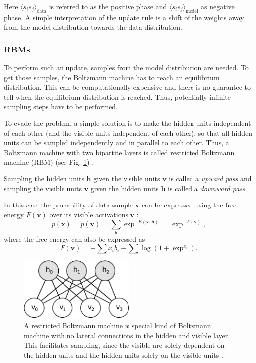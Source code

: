 Here $\langle s_i s_j \rangle_{\text{data}}$ is referred to as the positive phase and $ \langle s_i s_j \rangle_{\text{model}}$ as negative phase.
A simple interpretation of the update rule is a shift of the weights away from the model distribution towards the data distribution.

\subsubsection{RBMs} \label{c:rbms}

To perform such an update, samples from the model distribution are needed. 
To get those samples, the Boltzmann machine has to reach an equilibrium distribution. 
This can be computationally expensive and there is no guarantee to tell when the equilibrium distribution is reached.
Thus, potentially infinite sampling steps have to be performed.

To evade the problem, a simple solution is to make the hidden units independent of each other (and the visible units independent of each other), so that all hidden units can be sampled independently and in parallel to each other.
Thus, a Boltzmann machine with two bipartite layers is called restricted Boltzmann machine (RBM) (see Fig. \ref{fig:rbm}) \cite{smolensky1986information}.

Sampling the hidden units $\textbf{h}$ given the visible units $\textbf{v}$ is called a \textit{upward pass} and sampling the visible units $\textbf{v}$ given the hidden units $\textbf{h}$ is called a \textit{downward pass}.

In this case the probability of data sample $\textbf{x}$ can be expressed using the free energy $F(\textbf{v})$ over its visible activations $\textbf{v}$ \cite{Fischer2014, hinton2010practical}:
\[
p(\textbf{x}) =  p(\textbf{v}) = \sum_{\textbf{h}} \exp^{-E(\textbf{v},\textbf{h})} = \exp^{-F(\textbf{v})},
\]
where the free energy can also be expressed as
\[
F(\textbf{v}) = - \sum x_i b_i - \sum \log(1 + \exp^{x_i})  .
\]

\begin{figure}
	\centering
    	\includegraphics[width=0.5\textwidth]{imgs/rbm.png} 
    \caption[A restricted Boltzmann machine with 7 units.]{A restricted Boltzmann machine is special kind of Boltzmann machine with no lateral connections in the hidden and visible layer. This facilitates sampling, since the visible are solely dependent on the hidden units and the hidden units solely on the visible units \cite{theanoRBM}.}
	\label{fig:rbm}
\end{figure}

